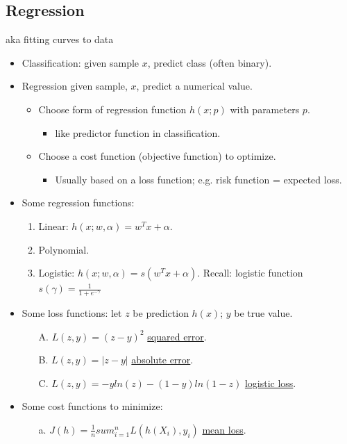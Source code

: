\documentclass[10pt]{article}
\begin{document}
	\subsection*{Regression} aka fitting curves to data
	\begin{itemize}
		\item Classification: given sample $x$, predict class (often binary).
		\item Regression given sample, $x$, predict a numerical value.
		\begin{itemize}
			\item Choose form of regression function $h(x;p)$ with parameters $p$.
			\begin{itemize}
				\item like predictor function in classification.
			\end{itemize}
			\item Choose a cost function (objective function) to optimize.
			\begin{itemize}
				\item Usually based on a loss function; e.g. risk function = expected loss.
			\end{itemize}
		\end{itemize}
		\item Some regression functions:
			\begin{enumerate}
				\item Linear: $h(x; w, \alpha) = w^{T}x + \alpha$.
				\item Polynomial.
				\item Logistic: $h(x; w, \alpha) = s(w^{T}x + \alpha)$. Recall: logistic function $s(\gamma) = \frac{1}{1 + e^{-\gamma}}$
			\end{enumerate}
		\item Some loss functions: let $z$ be prediction $h(x)$; $y$ be true value.
			\begin{enumerate}
				\item[A.] $L(z, y) = (z-y)^{2}$ \underline{squared error}.
				\item[B.] $L(z, y) = |z-y|$ \underline{absolute error}.
				\item[C.] $L(z, y) = -yln(z)-(1-y)ln(1-z)$ \underline{logistic loss}.
			\end{enumerate}
		\item Some cost functions to minimize:
			\begin{enumerate}
				\item[a.] $J(h) = \frac{1}{n}sum_{i=1}^{n}L(h(X_{i}),y_{i})$ \underline{mean loss}.

\end{enumerate}
\end{itemize}
\end{document}

